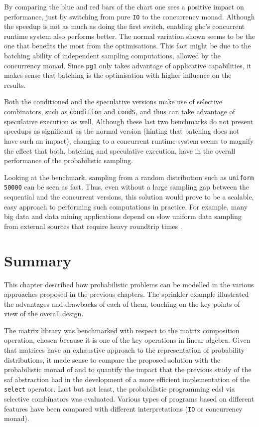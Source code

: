 \documentclass[
  oneside,
  11pt, a4paper,
  footinclude=true,
  headinclude=true,
  cleardoublepage=empty
]{scrbook}
\theoremstyle{definition}
\theoremstyle{definition}
\begin{document}
    
    By comparing the blue and red bars of the chart one sees a positive impact on performance, just by switching from pure \texttt{IO} to the concurrency monad. Although the speedup is not as much as doing the first switch, enabling \gls{ghc}'s concurrent runtime system also performs better. The normal variation shown seems to be the one that benefits the most from the optimisations. This fact might be due to the batching ability of independent sampling computations, allowed by the concurrency monad. Since \texttt{pg1} only takes advantage of applicative capabilities, it makes sense that batching is the optimisation with higher influence on the results.
    
    Both the conditioned and the speculative versions make use of selective combinators, such as \texttt{condition} and \texttt{condS}, and thus can take advantage of speculative execution as well. Although these last two benchmarks do not present speedups as significant as the normal version (hinting that batching does not have such an impact), changing to a concurrent runtime system seems to magnify the effect that both, batching and speculative execution, have in the overall performance of the probabilistic sampling.
    
    Looking at the benchmark, sampling from a random distribution such as \texttt{uniform 50000} can be seen as fast. Thus, even without a large sampling gap between the sequential and the concurrent versions, this solution would prove to be a scalable, easy approach to performing such computations in practice. For example, many big data and data mining applications depend on slow uniform data sampling from external sources that require heavy roundtrip times \citep{7917368, kim2019sampling, ZHOU2017350, 10.1145/3203217.3205863}.
    
    \section{Summary}
    
    This chapter described how probabilistic problems can be modelled in the various approaches proposed in the previous chapters. The sprinkler example illustrated the advantages and drawbacks of each of them, touching on the key points of view of the overall design.

    The matrix library was benchmarked with respect to the matrix composition operation, chosen because it is one of the key operations in linear algebra. Given that matrices have an exhaustive approach to the representation of probability distributions, it made sense to compare the proposed solution with the probabilistic monad of \cite{erwig_kollmansberger_2006} and to quantify the impact that the previous study of the \gls{saf} abstraction had in the development of a more efficient implementation of the \texttt{select} operator. Last but not least, the probabilistic programming \gls{edsl} via selective combinators was evaluated. Various types of programs based on different features have been compared with different interpretations (\texttt{IO} or concurrency monad).
\end{document}
